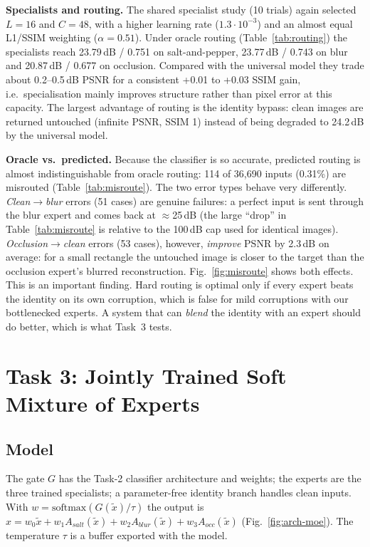 \documentclass[conference]{IEEEtran}
\begin{document}
\textbf{Specialists and routing.} The shared specialist study (10 trials) again selected $L{=}16$ and $C{=}48$, with a higher learning rate ($1.3{\cdot}10^{-3}$) and an almost equal L1/SSIM weighting ($\alpha{=}0.51$). Under oracle routing (Table~\ref{tab:routing}) the specialists reach 23.79\,dB / 0.751 on salt-and-pepper, 23.77\,dB / 0.743 on blur and 20.87\,dB / 0.677 on occlusion. Compared with the universal model they trade about 0.2--0.5\,dB PSNR for a consistent +0.01 to +0.03 SSIM gain, i.e.\ specialisation mainly improves structure rather than pixel error at this capacity. The largest advantage of routing is the identity bypass: clean images are returned untouched (infinite PSNR, SSIM 1) instead of being degraded to 24.2\,dB by the universal model.

\textbf{Oracle vs.\ predicted.} Because the classifier is so accurate, predicted routing is almost indistinguishable from oracle routing: 114 of 36,690 inputs (0.31\%) are misrouted (Table~\ref{tab:misroute}). The two error types behave very differently. \emph{Clean$\to$blur} errors (51 cases) are genuine failures: a perfect input is sent through the blur expert and comes back at $\approx$25\,dB (the large ``drop'' in Table~\ref{tab:misroute} is relative to the 100\,dB cap used for identical images). \emph{Occlusion$\to$clean} errors (53 cases), however, \emph{improve} PSNR by 2.3\,dB on average: for a small rectangle the untouched image is closer to the target than the occlusion expert's blurred reconstruction. Fig.~\ref{fig:misroute} shows both effects. This is an important finding. Hard routing is optimal only if every expert beats the identity on its own corruption, which is false for mild corruptions with our bottlenecked experts. A system that can \emph{blend} the identity with an expert should do better, which is what Task~3 tests.


\section{Task 3: Jointly Trained Soft Mixture of Experts}
\subsection{Model}
The gate $G$ has the Task-2 classifier architecture and weights; the experts are the three trained specialists; a parameter-free identity branch handles clean inputs. With $w=\mathrm{softmax}(G(\tilde x)/\tau)$ the output is
$\hat x = w_0\tilde x+w_1A_{salt}(\tilde x)+w_2A_{blur}(\tilde x)+w_3A_{occ}(\tilde x)$ (Fig.~\ref{fig:arch-moe}). The temperature $\tau$ is a buffer exported with the model.
\end{document}
